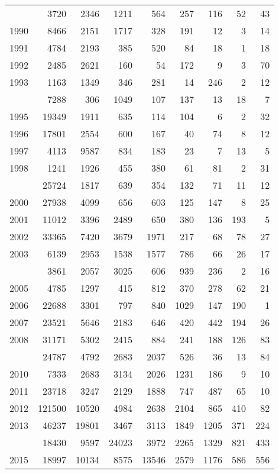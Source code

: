 \documentclass[
]{article}
\begin{document}
\begin{longtable}[t]{lrrrrrrrr}
\endfoot
\bottomrule
\endlastfoot
1989 & 3720 & 2346 & 1211 & 564 & 257 & 116 & 52 & 43\\
1990 & 8466 & 2151 & 1717 & 328 & 191 & 12 & 3 & 14\\
1991 & 4784 & 2193 & 385 & 520 & 84 & 18 & 1 & 18\\
1992 & 2485 & 2621 & 160 & 54 & 172 & 9 & 3 & 70\\
1993 & 1163 & 1349 & 346 & 281 & 14 & 246 & 2 & 12\\
\addlinespace
1994 & 7288 & 306 & 1049 & 107 & 137 & 13 & 18 & 7\\
1995 & 19349 & 1911 & 635 & 114 & 104 & 6 & 2 & 32\\
1996 & 17801 & 2554 & 600 & 167 & 40 & 74 & 8 & 12\\
1997 & 4113 & 9587 & 834 & 183 & 23 & 7 & 13 & 5\\
1998 & 1241 & 1926 & 455 & 380 & 61 & 81 & 2 & 31\\
\addlinespace
1999 & 25724 & 1817 & 639 & 354 & 132 & 71 & 11 & 12\\
2000 & 27938 & 4099 & 656 & 603 & 125 & 147 & 8 & 25\\
2001 & 11012 & 3396 & 2489 & 650 & 380 & 136 & 193 & 5\\
2002 & 33365 & 7420 & 3679 & 1971 & 217 & 68 & 78 & 27\\
2003 & 6139 & 2953 & 1538 & 1577 & 786 & 66 & 26 & 17\\
\addlinespace
2004 & 3861 & 2057 & 3025 & 606 & 939 & 236 & 2 & 16\\
2005 & 4785 & 1297 & 415 & 812 & 370 & 278 & 62 & 21\\
2006 & 22688 & 3301 & 797 & 840 & 1029 & 147 & 190 & 1\\
2007 & 23521 & 5646 & 2183 & 646 & 420 & 442 & 194 & 26\\
2008 & 31171 & 5302 & 2415 & 884 & 241 & 188 & 126 & 83\\
\addlinespace
2009 & 24787 & 4792 & 2683 & 2037 & 526 & 36 & 13 & 84\\
2010 & 7333 & 2683 & 3134 & 2026 & 1231 & 186 & 9 & 10\\
2011 & 23718 & 3247 & 2129 & 1888 & 747 & 487 & 65 & 10\\
2012 & 121500 & 10520 & 4984 & 2638 & 2104 & 865 & 410 & 82\\
2013 & 46237 & 19801 & 3467 & 3113 & 1849 & 1205 & 371 & 224\\
\addlinespace
2014 & 18430 & 9597 & 24023 & 3972 & 2265 & 1329 & 821 & 433\\
2015 & 18997 & 10134 & 8575 & 13546 & 2579 & 1176 & 586 & 556\\

\end{longtable}
\end{document}
